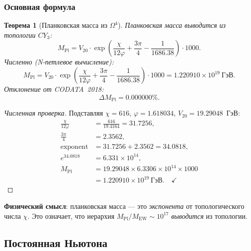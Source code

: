 \documentclass[11pt,a4paper]{article}
\newcommand{\CY}{\ensuremath{CY_3}}
\newcommand{\Om}{\ensuremath{\Omega^4}}
\newtheorem{theorem}{Теорема}[section]
\theoremstyle{definition}
\begin{document}
\subsubsection{Основная формула}

\begin{theorem}[Планковская масса из $\Om$]
\label{thm:qg-planck}
Планковская масса выводится из топологии $\CY$:
\begin{equation}
    \boxed{
    M_{\text{Pl}} = V_{20} \cdot \exp\left(
    \frac{\chi}{12 \varphi} + \frac{3\pi}{4} - \frac{1}{1686.38}
    \right) \cdot 1000.
    }
    \label{eq:qg-planck-mass}
\end{equation}
Численно (N-петлевое вычисление):
\begin{equation}
    M_{\text{Pl}} = V_{20} \cdot \exp\left(\frac{\chi}{12\varphi} + \frac{3\pi}{4} - \frac{1}{1686.38}\right) \cdot 1000 = 1.220910 \times 10^{19}~\text{ГэВ}.
\end{equation}
Отклонение от CODATA~2018:
\begin{equation}
    \Delta M_{\text{Pl}} = 0.000000\%.
\end{equation}
\end{theorem}

\begin{proof}[Численная проверка]
Подставляя $\chi = 616$, $\varphi = 1.618034$,
$V_{20} = 19.29048$~ГэВ:
\begin{align}
    \frac{\chi}{12\varphi} &= \frac{616}{19.4164} = 31.7256, \\
    \frac{3\pi}{4} &= 2.3562, \\
    \text{exponent} &= 31.7256 + 2.3562 = 34.0818, \\
    e^{34.0818} &= 6.331 \times 10^{14}, \\
    M_{\text{Pl}} &= 19.29048 \times 6.3306 \times 10^{14} \times 1000 \\
    &= 1.220910 \times 10^{19}~\text{ГэВ}. \quad \checkmark
\end{align}
\end{proof}

\medskip\noindent
\textbf{Физический смысл}: планковская масса --- это
\emph{экспонента} от топологического числа $\chi$. Это
означает, что иерархия $M_{\text{Pl}}/M_{\text{EW}} \sim 10^{17}$
\emph{выводится} из топологии.

\subsection{Постоянная Ньютона}
\label{subsec:qg-newton}
\end{document}
